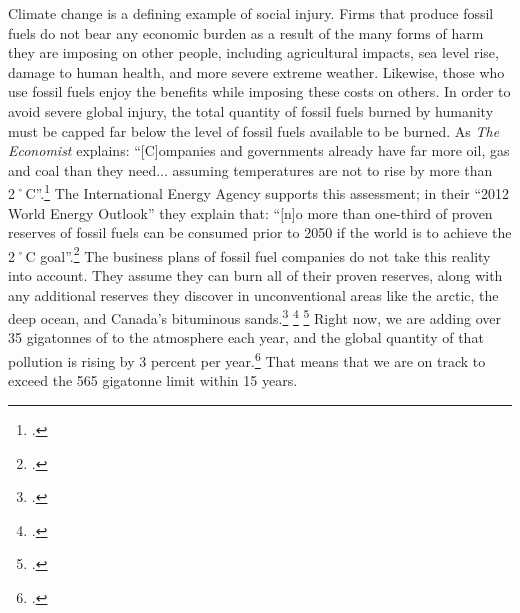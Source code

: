 \documentclass[10pt]{article}
\begin{document}
Climate change is a defining example of social injury.
Firms that produce fossil fuels do not bear any economic burden as a result of the many forms of harm they are imposing on other people, including agricultural impacts, sea level rise, damage to human health, and more severe extreme weather.
Likewise, those who use fossil fuels enjoy the benefits while imposing these costs on others.
In order to avoid severe global injury, the total quantity of fossil fuels burned by humanity must be capped far below the level of fossil fuels available to be burned. 
As \emph{The Economist} explains: ``[C]ompanies and governments already have far more oil, gas and coal than they need... assuming temperatures are not to rise by more than 2˚C''.\footcite[][]{EconomistUnburnable}
The International Energy Agency supports this assessment; in their ``2012 World Energy Outlook'' they explain that: ``[n]o more than one-third of proven reserves of fossil fuels can be consumed prior to 2050 if the world is to achieve the 2˚C goal''.\footcite[][p. 25]{IEA2012}
The business plans of fossil fuel companies do not take this reality into account.
They assume they can burn all of their proven reserves, along with any additional reserves they discover in unconventional areas like the arctic, the deep ocean, and Canada's bituminous sands.\footcite[U.S. Energy Information Administration estimates that there are 345 billion barrels of recoverable shale oil around the world, and 7,299 trillion cubic feet of shale gas: ][]{EIAShaleOilGas} \footcite[In their 2012 annual report, Shell describes how in the future they expect more of their ``production to come from unconventional sources than at present'' and how ``it is expected that both the  intensity of our production, as well as our absolute Upstream  emissions, will increase as our business grows''.][p. 14]{ShellAnnualReport2012} \footcite[BP expresses a similar concern: ``Over the long term it is likely that the carbon intensity of our upstream operations will continue to trend upwards as we move further into technically challenging and potentially more energy-intensive areas''.][p. 52]{BPAnnualReport2013}
Right now, we are adding over 35 gigatonnes of  to the atmosphere each year, and the global quantity of that pollution is rising by 3 percent per year.\footcite[][p. 26]{IPCCar4_syr}
That means that we are on track to exceed the 565 gigatonne limit within 15 years.
\end{document}

